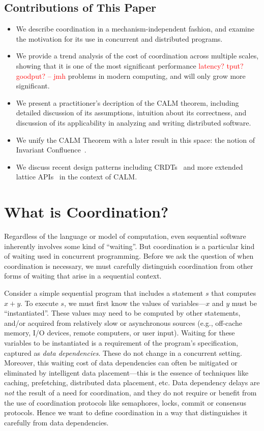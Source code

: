 \documentclass{sig-alternate}
\newcommand{\jmh}[1]{{\textcolor{red}{#1 -- jmh}}}
\begin{document}
\subsection{Contributions of This Paper}
\begin{itemize}
\item We describe coordination in a mechanism-independent fashion, and examine the motivation for its use in concurrent and distributed programs.
\item We provide a trend analysis of the cost of coordination across multiple scales, showing that it is one of the most significant performance \jmh{latency?  tput?  goodput?} problems in modern computing, and will only grow more significant.
\item We present a practitioner's decription of the CALM theorem, including detailed discussion of its assumptions, intuition about its correctness, and discussion of its applicability in analyzing and writing distributed software.
\item We unify the CALM Theorem with a later result in this space: the notion of Invariant Confluence~\cite{}.  
\item We discuss recent design patterns including CRDTs~\cite{crdts} and more extended lattice APIs~\cite{blooml} in the context of CALM.
\end{itemize}

\section{What is Coordination?}
Regardless of the language or model of computation, even sequential software inherently involves some kind of ``waiting''.  But coordination is a particular kind of waiting used in concurrent programming.  Before we ask the question of when coordination is necessary, we must carefully distinguish coordination from other forms of waiting that arise in a sequential context.

Consider a simple sequential program that includes a statement $s$ that computes $x + y$.  To execute $s$, we must first know the values of variables---$x$ and $y$ must be ``instantiated''.  These values may need to be computed by other statements, and/or acquired from relatively slow or asynchronous sources (e.g., off-cache memory, I/O devices, remote computers, or user input).  Waiting for these variables to be instantiated is a requirement of the program's specification, captured as \emph{data dependencies}.  These do not change in a concurrent setting.  Moreover, this waiting cost of data dependencies can often be mitigated or eliminated by intelligent data placement---this is the essence of techniques like caching, prefetching, distributed data placement, etc.  Data dependency delays are \emph{not} the result of a need for coordination, and they do not require or benefit from the use of coordination protocols like semaphores, locks, commit or consensus protocols.  Hence we want to define coordination in a way that distinguishes it carefully from data dependencies.
\end{document}
